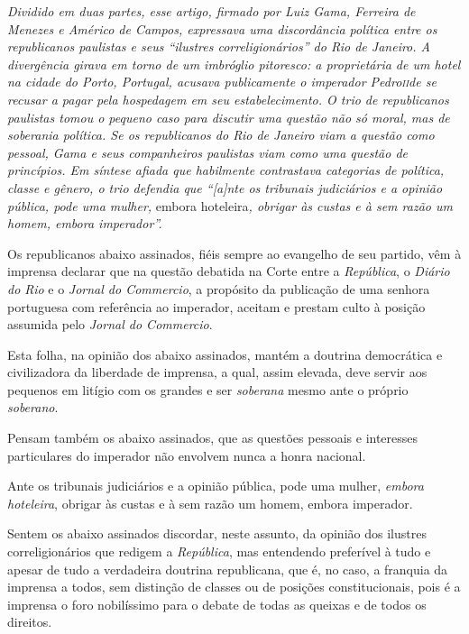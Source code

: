 \begin{didascalia}
\emph{Dividido em duas partes, esse artigo, firmado por Luiz Gama,
Ferreira de Menezes e Américo de Campos, expressava uma discordância
política entre os republicanos paulistas e seus ``ilustres
correligionários'' do Rio de Janeiro. A divergência girava em torno de um
imbróglio pitoresco: a proprietária de um hotel na cidade do Porto,
Portugal, acusava publicamente o imperador Pedro\textsc{ii}de se recusar a
pagar pela hospedagem em seu estabelecimento. O trio de republicanos
paulistas tomou o pequeno caso para discutir uma questão não só moral,
mas de soberania política. Se os republicanos do Rio de Janeiro viam a
questão como pessoal, Gama e seus companheiros paulistas viam como uma
questão de princípios. Em síntese afiada que habilmente contrastava
categorias de política, classe e gênero, o trio defendia que ``{[}a{]}nte
os tribunais judiciários e a opinião pública, pode uma mulher,} embora
hoteleira\emph{, obrigar às custas e à sem razão um homem, embora
imperador''.}
\end{didascalia}

Os republicanos abaixo assinados, fiéis sempre ao evangelho de seu
partido, vêm à imprensa declarar que na questão debatida na Corte entre
a \emph{República}, o \emph{Diário do Rio} e o \emph{Jornal do
Commercio}, a propósito da publicação de uma senhora portuguesa com
referência ao imperador, aceitam e prestam culto à posição assumida pelo
\emph{Jornal do Commercio}.

Esta folha, na opinião dos abaixo assinados, mantém a doutrina
democrática e civilizadora da liberdade de imprensa, a qual, assim
elevada, deve servir aos pequenos em litígio com os grandes e ser
\emph{soberana} mesmo ante o próprio \emph{soberano}.

Pensam também os abaixo assinados, que as questões pessoais e interesses
particulares do imperador não envolvem nunca a honra nacional.

Ante os tribunais judiciários e a opinião pública, pode uma mulher,
\emph{embora hoteleira}, obrigar às custas e à sem razão um homem,
embora imperador.

Sentem os abaixo assinados discordar, neste assunto, da opinião dos
ilustres correligionários que redigem a \emph{República}, mas entendendo
preferível à tudo e apesar de tudo a verdadeira doutrina republicana,
que é, no caso, a franquia da imprensa a todos, sem distinção de classes
ou de posições constitucionais, pois é a imprensa o foro nobilíssimo
para o debate de todas as queixas e de todos os direitos.

